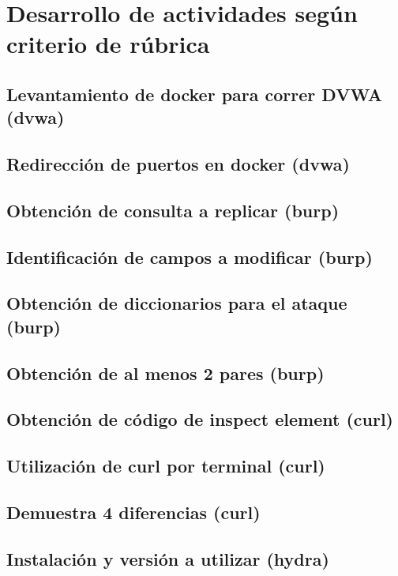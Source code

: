 \documentclass[letter,12pt]{article}
\begin{document}
\section{Desarrollo de actividades según criterio de rúbrica}

\subsection{Levantamiento de docker para correr DVWA (dvwa)}

\subsection{Redirección de puertos en docker (dvwa)}

\subsection{Obtención de consulta a replicar (burp)}

\subsection{Identificación de campos a modificar (burp)}

\subsection{Obtención de diccionarios para el ataque (burp)}

\subsection{Obtención de al menos 2 pares (burp)}

\subsection{Obtención de código de inspect element (curl)}

\subsection{Utilización de curl por terminal (curl)}

\subsection{Demuestra 4 diferencias (curl)}

\subsection{Instalación y versión a utilizar (hydra)}
\end{document}
